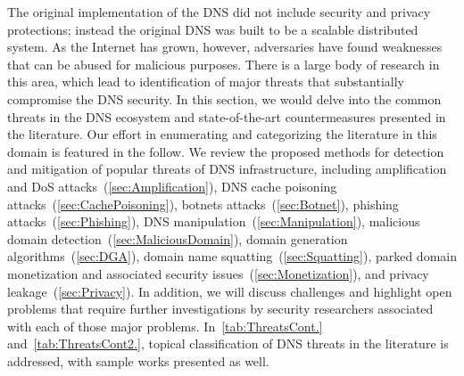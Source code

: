 \label{sec:Threats}
The original implementation of the DNS did not include security and privacy protections; instead the original DNS was built to be a scalable distributed system. As the Internet has grown, however, adversaries have found weaknesses that can be abused for malicious purposes. There is a large body of research in this area, which lead to identification of major threats that substantially compromise the DNS security. In this section, we would delve into the common threats in the DNS ecosystem and state-of-the-art countermeasures presented in the literature. 
Our effort in enumerating and categorizing the literature in this domain is featured in the follow. We review the proposed methods for detection and mitigation of popular threats of DNS infrastructure, including amplification and DoS attacks~(\textsection\ref{sec:Amplification}), DNS cache poisoning attacks~(\textsection\ref{sec:CachePoisoning}), botnets attacks~(\textsection\ref{sec:Botnet}), phishing attacks~(\textsection\ref{sec:Phishing}), DNS manipulation~(\textsection\ref{sec:Manipulation}), malicious domain detection~(\textsection\ref{sec:MaliciousDomain}), domain generation algorithms~(\textsection\ref{sec:DGA}), domain name squatting~(\textsection\ref{sec:Squatting}), parked domain monetization and associated security issues~(\textsection\ref{sec:Monetization}), and privacy leakage~(\textsection\ref{sec:Privacy}). 
In addition, we will discuss challenges and highlight open problems that require further investigations by security researchers associated with each of those major problems. In~\autoref{tab:ThreatsCont.} and~\autoref{tab:ThreatsCont2.}, topical classification of DNS threats in the literature is addressed, with sample works presented as well.

